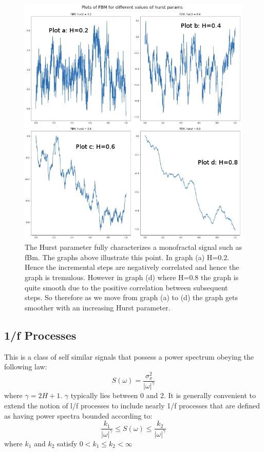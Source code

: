 \documentclass[a4paper]{article}
\begin{document}
\begin{figure}[h]
  \begin{minipage}[c]{0.6\textwidth}
    \includegraphics[width=\textwidth]{fbm_H2.png}
  \end{minipage}\hfill
  \begin{minipage}[c]{0.4\textwidth}
    \caption{
       The Hurst parameter fully characterizes a monofractal signal such as fBm. The graphs above
illustrate this point. In graph (a) H=0.2. Hence the incremental steps are negatively correlated
and hence the graph is tremulous. However in graph (d) where H=0.8 the graph is quite smooth
due to the positive correlation between subsequent steps. So therefore as we move from graph
(a) to (d) the graph gets smoother with an increasing Hurst parameter.
    } 
  \end{minipage}
\end{figure}

\subsection{1/f Processes}
This is a class of self similar signals that possess a power spectrum obeying the following law:
$$S(\omega)=\frac{\sigma_x^2}{|\omega|^\gamma}$$
where $\gamma=2H+1$. $\gamma$ typically lies between 0 and 2.
It is generally convenient to extend the notion of l/f processes to include nearly 1/f processes that are defined as having power spectra bounded according to:
$$\frac{k_1}{|\omega|^\gamma} \leq S(\omega) \leq \frac{k_2}{|\omega|^\gamma}$$
where $k_1$ and $k_2$ satisfy $0 < k_1 \leq k_2 < \infty $
\end{document}
